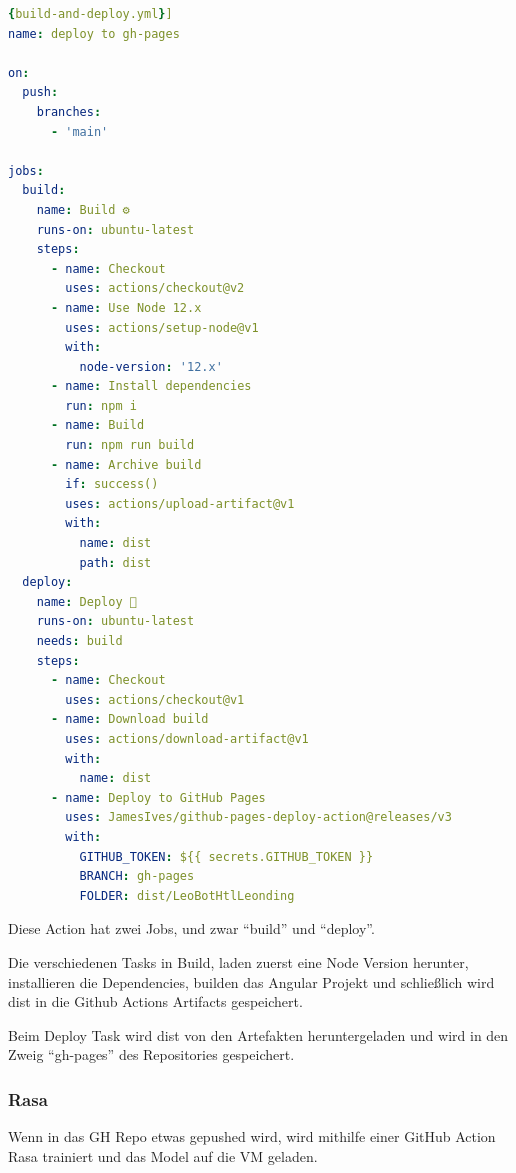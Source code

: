 \begin{lstlisting}[language=yaml,label={lst:buildanddeployyml},caption={build-and-deploy.yml}]{build-and-deploy.yml}]
name: deploy to gh-pages

on:
  push:
    branches:
      - 'main'

jobs:
  build:
    name: Build ⚙
    runs-on: ubuntu-latest
    steps:
      - name: Checkout
        uses: actions/checkout@v2
      - name: Use Node 12.x
        uses: actions/setup-node@v1
        with:
          node-version: '12.x'
      - name: Install dependencies
        run: npm i
      - name: Build
        run: npm run build
      - name: Archive build
        if: success()
        uses: actions/upload-artifact@v1
        with:
          name: dist
          path: dist
  deploy:
    name: Deploy 🚀
    runs-on: ubuntu-latest
    needs: build
    steps:
      - name: Checkout
        uses: actions/checkout@v1
      - name: Download build
        uses: actions/download-artifact@v1
        with:
          name: dist
      - name: Deploy to GitHub Pages
        uses: JamesIves/github-pages-deploy-action@releases/v3
        with:
          GITHUB_TOKEN: ${{ secrets.GITHUB_TOKEN }}
          BRANCH: gh-pages
          FOLDER: dist/LeoBotHtlLeonding
\end{lstlisting}

Diese Action hat zwei Jobs, und zwar ``build'' und ``deploy''.

Die verschiedenen Tasks in Build, laden zuerst eine Node Version herunter, installieren die Dependencies, builden das Angular Projekt und schließlich wird dist in die Github Actions Artifacts gespeichert.

Beim Deploy Task wird dist von den Artefakten  heruntergeladen und wird in den Zweig ``gh-pages'' des Repositories gespeichert.

\subsubsection{Rasa}

Wenn in das GH Repo etwas gepushed wird, wird mithilfe einer GitHub Action Rasa trainiert und das Model auf die VM geladen.

